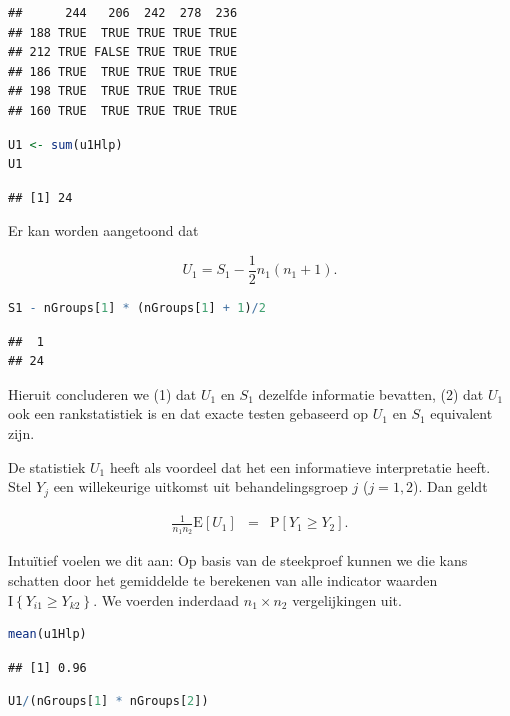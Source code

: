 \documentclass[
  12pt,dutch,coursenotes]{book}
\begin{document}
\begin{lstlisting}
##      244   206  242  278  236
## 188 TRUE  TRUE TRUE TRUE TRUE
## 212 TRUE FALSE TRUE TRUE TRUE
## 186 TRUE  TRUE TRUE TRUE TRUE
## 198 TRUE  TRUE TRUE TRUE TRUE
## 160 TRUE  TRUE TRUE TRUE TRUE
\end{lstlisting}

\begin{lstlisting}[language=R]
U1 <- sum(u1Hlp)
U1
\end{lstlisting}

\begin{lstlisting}
## [1] 24
\end{lstlisting}

Er kan worden aangetoond dat

\[U_1 = S_1 - \frac{1}{2}n_1(n_1+1).\]

\begin{lstlisting}[language=R]
S1 - nGroups[1] * (nGroups[1] + 1)/2
\end{lstlisting}

\begin{lstlisting}
##  1 
## 24
\end{lstlisting}

Hieruit concluderen we (1) dat \(U_1\) en \(S_1\) dezelfde informatie bevatten, (2) dat \(U_1\) ook een rankstatistiek is en dat exacte testen gebaseerd op \(U_1\) en \(S_1\) equivalent zijn.

De statistiek \(U_1\) heeft als voordeel dat het een informatieve interpretatie heeft.
Stel \(Y_j\) een willekeurige uitkomst uit behandelingsgroep \(j\) (\(j=1,2\)). Dan geldt

\begin{eqnarray*}
  \frac{1}{n_1n_2}\text{E}\left[U_1\right]
     &=& \text{P}\left[Y_1 \geq Y_2\right].
\end{eqnarray*}

Intuïtief voelen we dit aan: Op basis van de steekproef kunnen we die kans schatten door het gemiddelde te berekenen van alle indicator waarden \(\text{I}\left\{Y_{i1}\geq Y_{k2}\right\}\).
We voerden inderdaad \(n_1 \times n_2\) vergelijkingen uit.

\begin{lstlisting}[language=R]
mean(u1Hlp)
\end{lstlisting}

\begin{lstlisting}
## [1] 0.96
\end{lstlisting}

\begin{lstlisting}[language=R]
U1/(nGroups[1] * nGroups[2])
\end{lstlisting}
\end{document}

